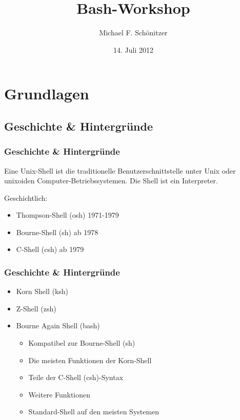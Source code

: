 \documentclass{beamer}
\title{Bash-Workshop}
\author{Michael F. Schönitzer}
\date{14. Juli 2012}
\begin{document}
\maketitle
 
\tableofcontents

\section{Grundlagen}
\subsection{Geschichte \& Hintergründe}
\begin{frame} %
  \frametitle{Geschichte \& Hintergründe} %
  \begin{Definition} %
    Eine Unix-Shell ist die traditionelle Benutzerschnittstelle unter Unix oder unixoiden Computer-Betriebssystemen. Die Shell ist ein Interpreter.
  \end{Definition}
  Geschichtlich:
  \begin{itemize}
   \item Thompson-Shell (osh) 1971-1979 
   \item Bourne-Shell (sh) ab 1978
   \item C-Shell (csh) ab 1979
  \end{itemize}
  
\end{frame}

\begin{frame}
  \frametitle{Geschichte \& Hintergründe} %
  
  \begin{itemize}
   \item Korn Shell (ksh)
   \item Z-Shell (zsh)
   \item Bourne Again Shell (bash)
   \begin{itemize}
    \item Kompatibel zur Bourne-Shell (sh)
    \item Die meisten Funktionen der Korn-Shell
    \item Teile der C-Shell (csh)-Syntax
    \item Weitere Funktionen
    \item Standard-Shell auf den meisten Systemen
   \end{itemize}
  \end{itemize}
\end{frame}
\end{document}
